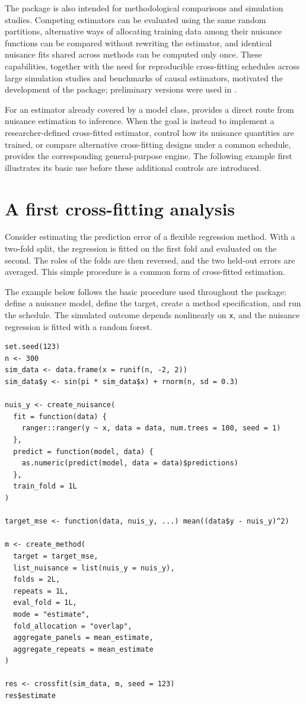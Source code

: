 The package is also intended for methodological comparisons and simulation studies. Competing estimators can be evaluated using the same random partitions, alternative ways of allocating training data among their nuisance functions can be compared without rewriting the estimator, and identical nuisance fits shared across methods can be computed only once. These capabilities, together with the need for reproducible cross-fitting schedules across large simulation studies and benchmarks of causal estimators, motivated the development of the package; preliminary versions were used in \citet{bouvier2024}.

For an estimator already covered by a  model class,  provides a direct route from nuisance estimation to inference. When the goal is instead to implement a researcher-defined cross-fitted estimator, control how its nuisance quantities are trained, or compare alternative cross-fitting designs under a common schedule,  provides the corresponding general-purpose engine. The following example first illustrates its basic use before these additional controls are introduced.

\section{A first cross-fitting analysis}\label{sec:first-analysis}

Consider estimating the prediction error of a flexible regression method. With a two-fold split, the regression is fitted on the first fold and evaluated on the second. The roles of the folds are then reversed, and the two held-out errors are averaged. This simple procedure is a common form of cross-fitted estimation.

The example below follows the basic procedure used throughout the package: define a nuisance model, define the target, create a method specification, and run the schedule. The simulated outcome depends nonlinearly on \texttt{x}, and the nuisance regression is fitted with a random forest.

\begin{verbatim}
set.seed(123)
n <- 300
sim_data <- data.frame(x = runif(n, -2, 2))
sim_data$y <- sin(pi * sim_data$x) + rnorm(n, sd = 0.3)

nuis_y <- create_nuisance(
  fit = function(data) {
    ranger::ranger(y ~ x, data = data, num.trees = 100, seed = 1)
  },
  predict = function(model, data) {
    as.numeric(predict(model, data = data)$predictions)
  },
  train_fold = 1L
)

target_mse <- function(data, nuis_y, ...) mean((data$y - nuis_y)^2)

m <- create_method(
  target = target_mse,
  list_nuisance = list(nuis_y = nuis_y),
  folds = 2L,
  repeats = 1L,
  eval_fold = 1L,
  mode = "estimate",
  fold_allocation = "overlap",
  aggregate_panels = mean_estimate,
  aggregate_repeats = mean_estimate
)

res <- crossfit(sim_data, m, seed = 123)
res$estimate
\end{verbatim}

